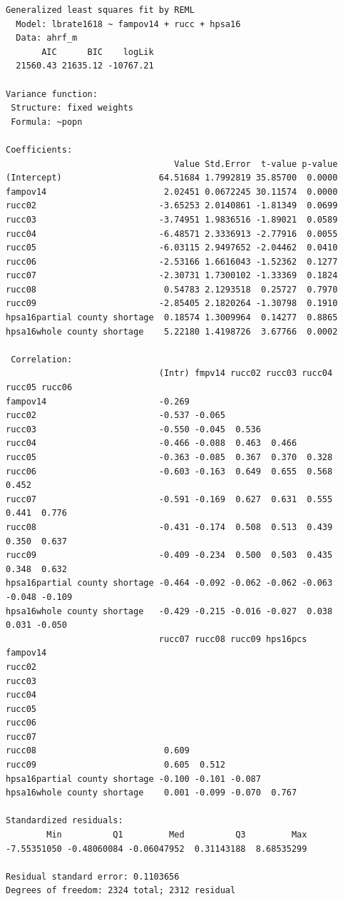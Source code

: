 \documentclass[
  letterpaper,
  DIV=11,
  numbers=noendperiod]{scrreprt}
\begin{document}
\begin{verbatim}
Generalized least squares fit by REML
  Model: lbrate1618 ~ fampov14 + rucc + hpsa16 
  Data: ahrf_m 
       AIC      BIC    logLik
  21560.43 21635.12 -10767.21

Variance function:
 Structure: fixed weights
 Formula: ~popn 

Coefficients:
                                 Value Std.Error  t-value p-value
(Intercept)                   64.51684 1.7992819 35.85700  0.0000
fampov14                       2.02451 0.0672245 30.11574  0.0000
rucc02                        -3.65253 2.0140861 -1.81349  0.0699
rucc03                        -3.74951 1.9836516 -1.89021  0.0589
rucc04                        -6.48571 2.3336913 -2.77916  0.0055
rucc05                        -6.03115 2.9497652 -2.04462  0.0410
rucc06                        -2.53166 1.6616043 -1.52362  0.1277
rucc07                        -2.30731 1.7300102 -1.33369  0.1824
rucc08                         0.54783 2.1293518  0.25727  0.7970
rucc09                        -2.85405 2.1820264 -1.30798  0.1910
hpsa16partial county shortage  0.18574 1.3009964  0.14277  0.8865
hpsa16whole county shortage    5.22180 1.4198726  3.67766  0.0002

 Correlation: 
                              (Intr) fmpv14 rucc02 rucc03 rucc04 rucc05 rucc06
fampov14                      -0.269                                          
rucc02                        -0.537 -0.065                                   
rucc03                        -0.550 -0.045  0.536                            
rucc04                        -0.466 -0.088  0.463  0.466                     
rucc05                        -0.363 -0.085  0.367  0.370  0.328              
rucc06                        -0.603 -0.163  0.649  0.655  0.568  0.452       
rucc07                        -0.591 -0.169  0.627  0.631  0.555  0.441  0.776
rucc08                        -0.431 -0.174  0.508  0.513  0.439  0.350  0.637
rucc09                        -0.409 -0.234  0.500  0.503  0.435  0.348  0.632
hpsa16partial county shortage -0.464 -0.092 -0.062 -0.062 -0.063 -0.048 -0.109
hpsa16whole county shortage   -0.429 -0.215 -0.016 -0.027  0.038  0.031 -0.050
                              rucc07 rucc08 rucc09 hps16pcs
fampov14                                                   
rucc02                                                     
rucc03                                                     
rucc04                                                     
rucc05                                                     
rucc06                                                     
rucc07                                                     
rucc08                         0.609                       
rucc09                         0.605  0.512                
hpsa16partial county shortage -0.100 -0.101 -0.087         
hpsa16whole county shortage    0.001 -0.099 -0.070  0.767  

Standardized residuals:
        Min          Q1         Med          Q3         Max 
-7.55351050 -0.48060084 -0.06047952  0.31143188  8.68535299 

Residual standard error: 0.1103656 
Degrees of freedom: 2324 total; 2312 residual
\end{verbatim}
\end{document}
